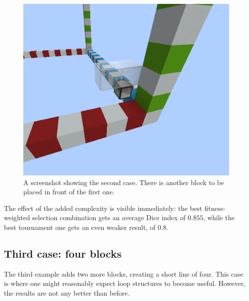 \documentclass{report}
\begin{document}
\begin{figure}[H]
    \centering
    \includegraphics[scale=0.3]{minecraft3}
    \caption{A screenshot showing the second case. There is another block to be placed in front of the first one.}
\end{figure}

The effect of the added complexity is visible immediately: the best fitness-weighted selection combination gets an average Dice index of $0.855$, while the best tournament one gets an even weaker result, of $0.8$.

\subsection{Third case: four blocks}

The third example adds two more blocks, creating a short line of four. This case is where one might reasonably expect loop structures to become useful. However, the results are not any better than before.
\end{document}
